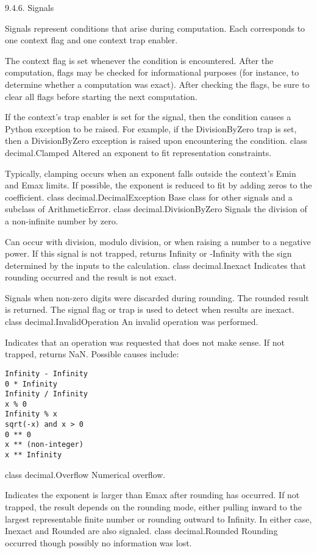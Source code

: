 9.4.6. Signals

Signals represent conditions that arise during computation. Each corresponds to one context flag and one context trap enabler.

The context flag is set whenever the condition is encountered. After the computation, flags may be checked for informational purposes (for instance, to determine whether a computation was exact). After checking the flags, be sure to clear all flags before starting the next computation.

If the context’s trap enabler is set for the signal, then the condition causes a Python exception to be raised. For example, if the DivisionByZero trap is set, then a DivisionByZero exception is raised upon encountering the condition.
class decimal.Clamped
Altered an exponent to fit representation constraints.

Typically, clamping occurs when an exponent falls outside the context’s Emin and Emax limits. If possible, the exponent is reduced to fit by adding zeros to the coefficient.
class decimal.DecimalException
Base class for other signals and a subclass of ArithmeticError.
class decimal.DivisionByZero
Signals the division of a non-infinite number by zero.

Can occur with division, modulo division, or when raising a number to a negative power. If this signal is not trapped, returns Infinity or -Infinity with the sign determined by the inputs to the calculation.
class decimal.Inexact
Indicates that rounding occurred and the result is not exact.

Signals when non-zero digits were discarded during rounding. The rounded result is returned. The signal flag or trap is used to detect when results are inexact.
class decimal.InvalidOperation
An invalid operation was performed.

Indicates that an operation was requested that does not make sense. If not trapped, returns NaN. Possible causes include:

\begin{lstlisting}
Infinity - Infinity
0 * Infinity
Infinity / Infinity
x % 0
Infinity % x
sqrt(-x) and x > 0
0 ** 0
x ** (non-integer)
x ** Infinity
\end{lstlisting}

class decimal.Overflow
Numerical overflow.

Indicates the exponent is larger than Emax after rounding has occurred. If not trapped, the result depends on the rounding mode, either pulling inward to the largest representable finite number or rounding outward to Infinity. In either case, Inexact and Rounded are also signaled.
class decimal.Rounded
Rounding occurred though possibly no information was lost.

